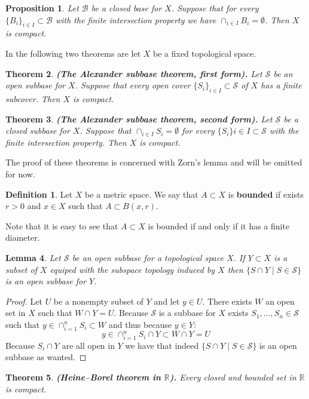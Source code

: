\documentclass[11pt,a4paper]{article}
\theoremstyle{definition}
\newtheorem{definition}{Definition}[section]
\theoremstyle{plain}
\newtheorem{theorem}{Theorem}[section]
\newtheorem{proposition}[theorem]{Proposition}
\newtheorem{lemma}[theorem]{Lemma}
\newcommand{\R}{\mathbb{R}}
\renewcommand{\tt}[1]{\textnormal{\textbf{(#1).}}} %
\begin{document}
  \begin{proposition}
    Let $\mathcal{B}$ be a closed base for $X$. Suppose that for every 
    $\{B_i\}_{i \in I} \subset \mathcal{B}$ with the finite intersection 
    property we have $\cap_{i \in I}{B_i} = \emptyset$. Then $X$ is 
    compact.
  \end{proposition}
  In the following two theorems are let $X$ be a fixed topological space.
  \begin{theorem}
    \tt{The Alexander subbase theorem, first form}
    Let $\mathcal{S}$ be an open subbase for $X$. Suppose that every 
    open cover $\{S_i\}_{i \in I} \subset \mathcal{S}$ of $X$ has a 
    finite subcover. Then $X$ is compact.
  \end{theorem}
  \begin{theorem}
  \tt{The Alexander subbase theorem, second form}
  Let $\mathcal{S}$ be a closed subbase for $X$. Suppose that 
  $\cap_{i \in I}{S_i} = \emptyset$ for every 
  $\{S_i\}{i \in I} \subset \mathcal{S}$ with the finite intersection 
  property. Then $X$ is compact.
  \end{theorem}
  The proof of these theorems is concerned with Zorn's lemma and will
  be omitted for now.
  \begin{definition}
    Let $X$ be a metric space. We say that $A \subset X$ is 
    \textbf{bounded} if exists $r > 0$ and $x \in X$ such that
    $A \subset B(x,r)$.
  \end{definition}
  Note that it is easy to see that $A \subset X$ is bounded if and only
  if it has a finite diameter.
  \begin{lemma}
    Let $\mathcal{S}$ be an open subbase for a topological space $X$.
    If $Y \subset X$ is a subset of $X$ equiped with the subspace
    topology induced by $X$ then $\{S \cap Y \mid S \in \mathcal{S}\}$
    is an open subbase for $Y$.
  \end{lemma}
  \begin{proof}
    Let $U$ be a nonempty subset of $Y$ and let $y \in U$. There
    exists $W$ an open set in $X$ such that $W \cap Y = U$. Because
    $\mathcal{S}$ is a subbase for $X$ exists 
    $S_1,\dots,S_n \in \mathcal{S}$ such that 
    $y \in \cap_{i=1}^{n}{S_i} \subset W$ and thus because $y \in Y$:
    \[
      y \in \cap_{i=1}^{n}{S_i \cap Y} \subset W \cap Y = U
    \]
    Because $S_i \cap Y$ are all open in $Y$ we have that indeed
    $\{S \cap Y \mid S \in \mathcal{S}\}$ is an open subbase as wanted.
  \end{proof}
  \begin{theorem}
    \tt{Heine–Borel theorem in $\R$}
    Every closed and bounded set in $\R$ is compact.
  \end{theorem}
\end{document}
